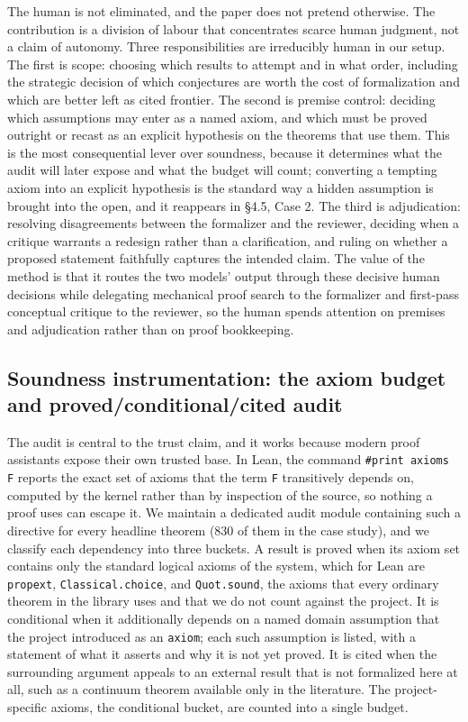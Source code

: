 \documentclass[11pt]{article}
\begin{document}
The human is not eliminated, and the paper does not pretend otherwise. The contribution is a
division of labour that concentrates scarce human judgment, not a claim of autonomy. Three
responsibilities are irreducibly human in our setup. The first is scope: choosing which results to
attempt and in what order, including the strategic decision of which conjectures are worth the cost
of formalization and which are better left as cited frontier. The second is premise control:
deciding which assumptions may enter as a named axiom, and which must be proved outright or recast
as an explicit hypothesis on the theorems that use them. This is the most consequential lever over
soundness, because it determines what the audit will later expose and what the budget will count;
converting a tempting axiom into an explicit hypothesis is the standard way a hidden assumption is
brought into the open, and it reappears in §4.5, Case 2. The third is adjudication: resolving
disagreements between the formalizer and the reviewer, deciding when a critique warrants a redesign
rather than a clarification, and ruling on whether a proposed statement faithfully captures the
intended claim. The value of the method is that it routes the two models' output through these
decisive human decisions while delegating mechanical proof search to the formalizer and
first-pass conceptual critique to the reviewer, so the human spends attention on premises and
adjudication rather than on proof bookkeeping.

\subsection{Soundness instrumentation: the axiom budget and proved/conditional/cited audit}

The audit is central to the trust claim, and it works because modern proof assistants expose their
own trusted base. In Lean, the command \texttt{\#print axioms F} reports the exact set of axioms that the
term \texttt{F} transitively depends on, computed by the kernel rather than by inspection of the source,
so nothing a proof uses can escape it. We maintain a dedicated audit module containing such a
directive for every headline theorem (830 of them in the case study), and we classify each
dependency into three buckets. A result is proved when its axiom set contains only the standard
logical axioms of the system, which for Lean are \texttt{propext}, \texttt{Classical.choice}, and \texttt{Quot.sound},
the axioms that every ordinary theorem in the library uses and that we do not count against the
project. It is conditional when it additionally depends on a named domain assumption that the
project introduced as an \texttt{axiom}; each such assumption is listed, with a statement of what it
asserts and why it is not yet proved. It is cited when the surrounding argument appeals to an
external result that is not formalized here at all, such as a continuum theorem available only in
the literature. The project-specific axioms, the conditional bucket, are counted into a single
budget.
\end{document}
